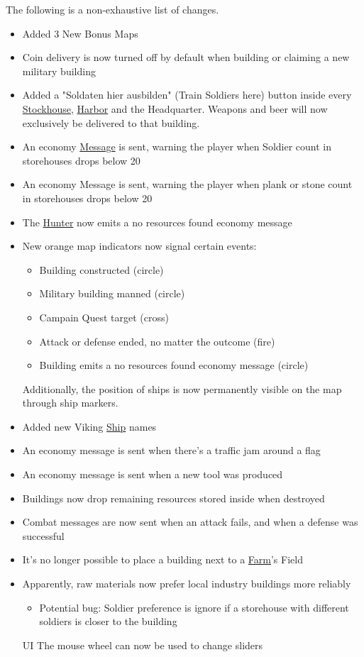 \documentclass[12pt]{article}
\begin{document}
The following is a non-exhaustive list of changes.

\begin{itemize}
  \item Added 3 New Bonus Maps
  \item Coin delivery is now turned off by default when building or claiming a new military building
  \item Added a "Soldaten hier ausbilden" (Train Soldiers here) button inside every \hyperref[sec:stockhouse]{Stockhouse}, \hyperref[sec:harbor]{Harbor} and the Headquarter. Weapons and beer will now exclusively be delivered to that building.
  \item An economy \hyperref[sec:messages]{Message} is sent, warning the player when Soldier count in storehouses drops below 20
  \item An economy Message is sent, warning the player when plank or stone count in storehouses drops below 20
  \item The \hyperref[sec:hunter]{Hunter} now emits a no resources found economy message
  \item New orange map indicators now signal certain events:
    \begin{itemize}
      \item Building constructed (circle)
      \item Military building manned (circle)
      \item Campain Quest target (cross)
      \item Attack or defense ended, no matter the outcome (fire)
      \item Building emits a no resources found economy message (circle)
    \end{itemize}
    Additionally, the position of ships is now permanently visible on the map through ship markers.
  \item Added new Viking \hyperref[sec:ships]{Ship} names
  \item An economy message is sent when there's a traffic jam around a flag
  \item An economy message is sent when a new tool was produced
  \item Buildings now drop remaining resources stored inside when destroyed
  \item Combat messages are now sent when an attack fails, and when a defense was successful
  \item It's no longer possible to place a building next to a \hyperref[sec:farm]{Farm}'s Field
  \item Apparently, raw materials now prefer local industry buildings more reliably
     \begin{itemize}
       \item Potential bug: Soldier preference is ignore if a storehouse with different soldiers is closer to the building
     \end{itemize}
  \item [UI] The mouse wheel can now be used to change sliders
\end{itemize}
\end{document}
